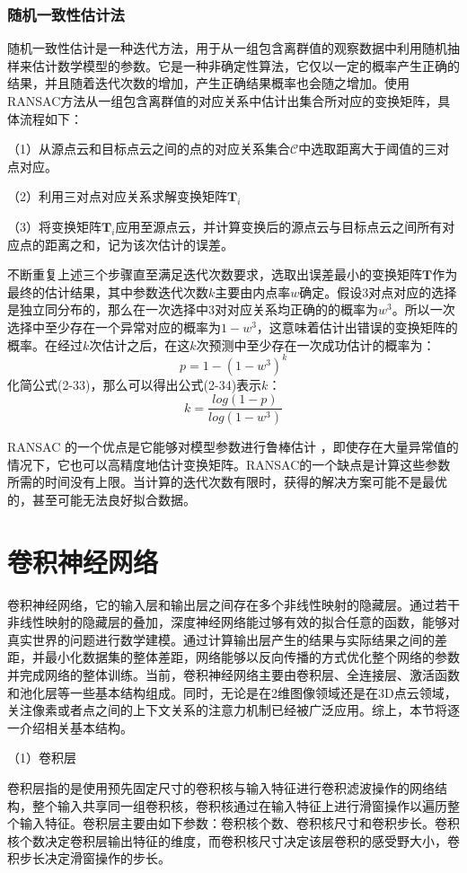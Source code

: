     \subsubsection{随机一致性估计法}
    随机一致性估计是一种迭代方法，用于从一组包含离群值的观察数据中利用随机抽样来估计数学模型的参数。它是一种非确定性算法，它仅以一定的概率产生正确的结果，并且随着迭代次数的增加，产生正确结果概率也会随之增加。使用RANSAC方法从一组包含离群值的对应关系中估计出集合所对应的变换矩阵，具体流程如下：\par
    （1）从源点云和目标点云之间的点的对应关系集合$\mathcal{C}$中选取距离大于阈值的三对点对应。\par
    （2）利用三对点对应关系求解变换矩阵$\mathbf{T}_i$\par
    （3）将变换矩阵$\mathbf{T}_i$应用至源点云，并计算变换后的源点云与目标点云之间所有对应点的距离之和，记为该次估计的误差。\par
    不断重复上述三个步骤直至满足迭代次数要求，选取出误差最小的变换矩阵$\mathbf{T}$作为最终的估计结果，其中参数迭代次数$k$主要由内点率$w$确定。假设3对点对应的选择是独立同分布的，那么在一次选择中3对对应关系均正确的的概率为$w^3$。所以一次选择中至少存在一个异常对应的概率为$1-w^3$，这意味着估计出错误的变换矩阵的概率。在经过$k$次估计之后，在这$k$次预测中至少存在一次成功估计的概率为：
    \begin{equation}
        p =1 - (1-w^3)^k
    \end{equation}
    化简公式(2-33)，那么可以得出公式(2-34)表示$k$：
    \begin{equation}
        k = \frac{log(1-p)}{log(1-w^3)}
    \end{equation}\par
    RANSAC 的一个优点是它能够对模型参数进行鲁棒估计 ，即使存在大量异常值的情况下，它也可以高精度地估计变换矩阵。RANSAC的一个缺点是计算这些参数所需的时间没有上限。当计算的迭代次数有限时，获得的解决方案可能不是最优的，甚至可能无法良好拟合数据。

\section{卷积神经网络}
卷积神经网络，它的输入层和输出层之间存在多个非线性映射的隐藏层。通过若干非线性映射的隐藏层的叠加，深度神经网络能过够有效的拟合任意的函数，能够对真实世界的问题进行数学建模。通过计算输出层产生的结果与实际结果之间的差距，并最小化数据集的整体差距，网络能够以反向传播的方式优化整个网络的参数并完成网络的整体训练。当前，卷积神经网络主要由卷积层、全连接层、激活函数和池化层等一些基本结构组成。同时，无论是在2维图像领域还是在3D点云领域，关注像素或者点之间的上下文关系的注意力机制已经被广泛应用。综上，本节将逐一介绍相关基本结构。\par
（1）卷积层\par
卷积层指的是使用预先固定尺寸的卷积核与输入特征进行卷积滤波操作的网络结构，整个输入共享同一组卷积核，卷积核通过在输入特征上进行滑窗操作以遍历整个输入特征。卷积层主要由如下参数：卷积核个数、卷积核尺寸和卷积步长。卷积核个数决定卷积层输出特征的维度，而卷积核尺寸决定该层卷积的感受野大小，卷积步长决定滑窗操作的步长。

